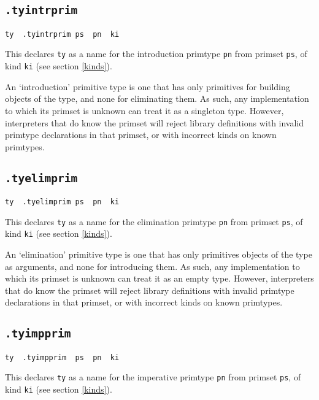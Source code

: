 \documentclass{report}
\newcommand\stringcode[1]{\texttt{#1}}
\begin{document}
\subsection{\stringcode{.tyintrprim}}

\begin{verbatim}
ty	.tyintrprim	ps	pn	ki
\end{verbatim}

This declares \stringcode{ty} as a name for the introduction primtype \stringcode{pn} from primset \stringcode{ps}, of kind \stringcode{ki} (see section \ref{kinds}).

An `introduction' primitive type is one that has only primitives for building objects of the type, and none for eliminating them.
As such, any implementation to which its primset is unknown can treat it as a singleton type.
However, interpreters that do know the primset will reject library definitions with invalid primtype declarations in that primset,
or with incorrect kinds on known primtypes.

\subsection{\stringcode{.tyelimprim}}

\begin{verbatim}
ty	.tyelimprim	ps	pn	ki
\end{verbatim}

This declares \stringcode{ty} as a name for the elimination primtype \stringcode{pn} from primset \stringcode{ps}, of kind \stringcode{ki} (see section \ref{kinds}).

An `elimination' primitive type is one that has only primitives objects of the type as arguments, and none for introducing them.
As such, any implementation to which its primset is unknown can treat it as an empty type.
However, interpreters that do know the primset will reject library definitions with invalid primtype declarations in that primset,
or with incorrect kinds on known primtypes.

\subsection{\stringcode{.tyimpprim}}

\begin{verbatim}
ty	.tyimpprim	ps	pn	ki
\end{verbatim}

This declares \stringcode{ty} as a name for the imperative primtype \stringcode{pn} from primset \stringcode{ps}, of kind \stringcode{ki} (see section \ref{kinds}).
\end{document}
